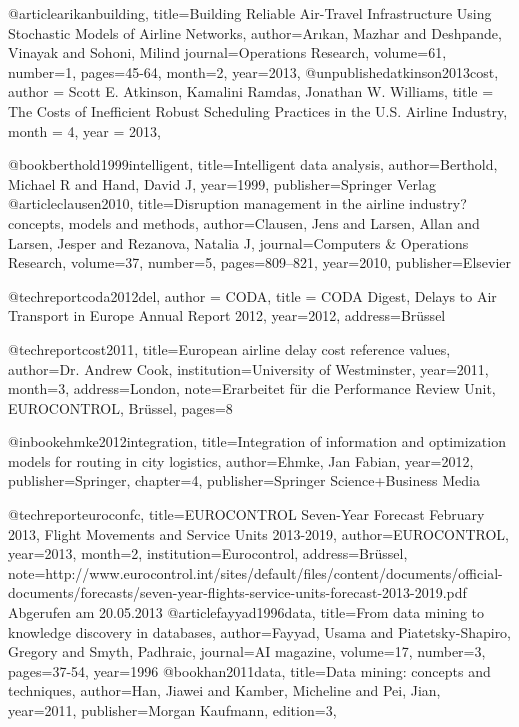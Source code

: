 @article{arikanbuilding,
  title={Building Reliable Air-Travel Infrastructure Using Stochastic Models of Airline Networks},
  author={Ar{\i}kan, Mazhar and Deshpande, Vinayak and Sohoni, Milind}
  journal={Operations Research},
  volume={61},
  number={1},
  pages={45-64},
  month={2},
  year={2013},
}
@unpublished{atkinson2013cost,
author = {Scott E. Atkinson, Kamalini Ramdas, Jonathan W. Williams},
title = {The Costs of Inefficient Robust Scheduling Practices in the U.S. Airline Industry},
month = {4},
year = {2013},
}

@book{berthold1999intelligent,
  title={Intelligent data analysis},
  author={Berthold, Michael R and Hand, David J},
  year={1999},
  publisher={Springer Verlag}
}
@article{clausen2010,
  title={Disruption management in the airline industry?concepts, models and methods},
  author={Clausen, Jens and Larsen, Allan and Larsen, Jesper and Rezanova, Natalia J},
  journal={Computers \& Operations Research},
  volume={37},
  number={5},
  pages={809--821},
  year={2010},
  publisher={Elsevier}
}

@techreport{coda2012del,
author = {CODA},
title = {CODA Digest, Delays to Air Transport in Europe Annual Report 2012},
year={2012},
address={Brüssel}
}

@techreport{cost2011,
	title={European airline delay cost reference values},
	author={Dr. Andrew Cook},
	institution={University of Westminster},
	year={2011},
	month={3},
	address={London},
	note={Erarbeitet für die Performance Review Unit, EUROCONTROL, Brüssel},
	pages={8}
}

@inbook{ehmke2012integration,
  title={Integration of information and optimization models for routing in city logistics},
  author={Ehmke, Jan Fabian},
  year={2012},
  publisher={Springer},
  chapter={4},
  publisher={Springer Science+Business Media}
}


@techreport{euroconfc,
	title={EUROCONTROL Seven-Year Forecast February 2013, Flight Movements and Service Units 2013-2019},
	author={EUROCONTROL},
	year={2013},
	month={2},
	institution={Eurocontrol},
	address={Brüssel},
	note={http://www.eurocontrol.int/sites/default/files/content/documents/official-documents/forecasts/seven-year-flights-service-units-forecast-2013-2019.pdf
	Abgerufen am 20.05.2013}
}
@article{fayyad1996data,
  title={From data mining to knowledge discovery in databases},
  author={Fayyad, Usama and Piatetsky-Shapiro, Gregory and Smyth, Padhraic},
  journal={AI magazine},
  volume={17},
  number={3},
  pages={37-54},
  year={1996}
}
@book{han2011data,
  title={Data mining: concepts and techniques},
  author={Han, Jiawei and Kamber, Micheline and Pei, Jian},
  year={2011},
  publisher={Morgan Kaufmann},
  edition={3},
}

